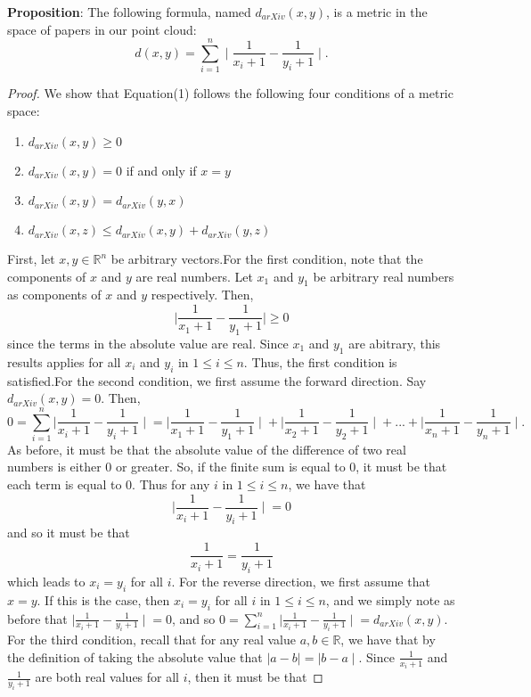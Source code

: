 \documentclass[12pt]{article}
\theoremstyle{definition}
\begin{document}
\textbf{Proposition}: The following formula, named $d_{arXiv}(x,y)$, is a metric in the space of papers in our point cloud:
	\begin{equation}
	d(x,y)=\sum_{i=1}^{n}\mid\frac{1}{x_i+1}-\frac{1}{y_i+1}\mid.
	\end{equation}
	\begin{proof}
		We show that Equation(1) follows the following four conditions of a metric space: 						
        \begin{enumerate}
			\item $d_{arXiv}(x,y)\geq 0$
			\item $d_{arXiv}(x,y)=0$ if and only if $x=y$
			\item $d_{arXiv}(x,y)=d_{arXiv}(y,x)$
			\item $d_{arXiv}(x,z)\leq d_{arXiv}(x,y)+d_{arXiv}(y,z)$
		\end{enumerate}
		First, let $x,y\in\mathbb{R}^n$ be arbitrary vectors.\newline For the first condition, note that the components of $x$ and $y$ are real numbers. Let $x_1$ and $y_1$ be arbitrary real numbers as components of $x$ and $y$ respectively. Then, 
        \begin{equation}
		\mid\frac{1}{x_1+1}-\frac{1}{y_1+1}\mid\geq 0
		\end{equation} since the terms in the absolute value are real. Since $x_1$ and $y_1$ are abitrary, this results applies for all $x_i$ and $y_i$ in $1\leq i\leq n$. Thus, the first condition is satisfied.\newline For the second condition, we first assume the forward direction. Say $d_{arXiv}(x,y)=0$. Then,
        \begin{dmath}
		0 = \sum_{i=1}^{n}{\mid\frac{1}{x_i+1}-\frac{1}{y_i+1}\mid} = {\mid\frac{1}{x_1+1}-\frac{1}{y_1+1}\mid} + {\mid\frac{1}{x_2+1}-\frac{1}{y_2+1}\mid} + ... + {\mid\frac{1}{x_n+1}-\frac{1}{y_n+1}\mid}.
        \end{dmath}
		As before, it must be that the absolute value of the difference of two real numbers is either 0 or greater. So, if the finite sum is equal to 0, it must be that each term is equal to 0. Thus for any $i$ in $1\leq i\leq n$, we have that 
        \begin{equation}
		{\mid\frac{1}{x_i+1}-\frac{1}{y_i+1}\mid} = 0
		\end{equation} 
		and so it must be that 
        \begin{equation}
		\frac{1}{x_i+1}=\frac{1}{y_i+1}
        \end{equation} which leads to $x_i=y_i$ for all $i$. For the reverse direction, we first assume that $x=y$. If this is the case, then $x_i=y_i$ for all $i$ in $1\leq i\leq n$, and we simply note as before that ${\mid\frac{1}{x_i+1}-\frac{1}{y_i+1}\mid} = 0$, and so $0 = \sum_{i=1}^{n}{\mid\frac{1}{x_i+1}-\frac{1}{y_i+1}\mid}=d_{arXiv}(x,y)$. \newline For the third condition, recall that for any real value $a,b\in\mathbb{R}$, we have that by the definition of taking the absolute value that $\mid a-b\mid = \mid b-a\mid$. Since $\frac{1}{x_i+1}$ and $\frac{1}{y_i+1}$ are both real values for all $i$, then it must be that 

\end{proof}
\end{document}
